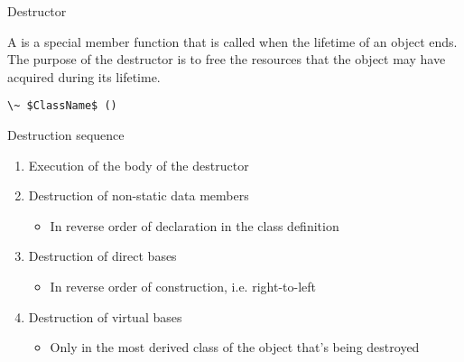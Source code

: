 \begin{frame}{Destructor}{}
  \begin{definition}[Destructor]
    A  is a special member function that is called when the lifetime of an object ends. The purpose of the destructor is to free the resources that the object may have acquired during its lifetime.

    {
      \hfill\lstinline[mathescape]!\~ $ClassName$ ()!\hfill
    }
  \end{definition}

  \begin{block}{Destruction sequence}
    \begin{enumerate}
    \item
      Execution of the body of the destructor
    \item
      Destruction of non-static data members
      \begin{itemize}
      \item
        In reverse order of declaration in the class definition
      \end{itemize}
    \item
      Destruction of direct bases
      \begin{itemize}
      \item
        In reverse order of construction, i.e. right-to-left
      \end{itemize}
    \item
      Destruction of virtual bases
      \begin{itemize}
      \item
        Only in the most derived class of the object that's being destroyed
      \end{itemize}
    \end{enumerate}
  \end{block}
\end{frame}

